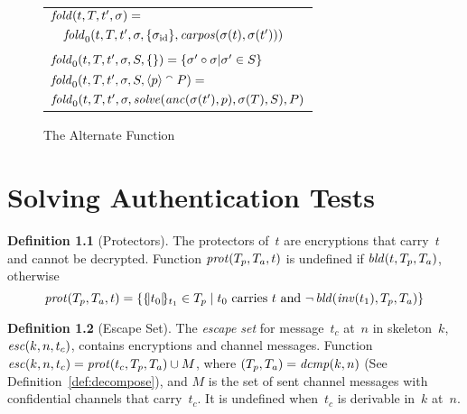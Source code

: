 \documentclass[12pt]{report}
\theoremstyle{definition}
\newtheorem{defn}{Definition}[chapter]
\begin{document}
\begin{figure}
\begin{center}
\begin{tabular}{l}
$\operatorname{\mathit{fold}}(t,T,t',\sigma)={}$\\
$\quad\operatorname{\mathit{fold}}_0(t,T,t',\sigma,\{\sigma_{\mathrm{id}}\},\operatorname{\mathit{carpos}}(\sigma(t), \sigma(t')))$\\
\\
$\operatorname{\mathit{fold}}_0(t,T,t',\sigma,S,\{\})=\{\sigma' \circ \sigma | \sigma' \in S\}$\\
$\operatorname{\mathit{fold}}_0(t,T,t',\sigma,S,\langle p\rangle \mathbin{{}^\smallfrown} P)={}$\\
\quad
$\operatorname{\mathit{fold}}_0(t,T,t',\sigma,\operatorname{\mathit{solve}}(\operatorname{\mathit{anc}}(\sigma(t'),p),\sigma(T),S),P)$\\
\end{tabular}
\end{center}
\caption{The Alternate  Function}\label{fig:fold}
\end{figure}

\chapter{Solving Authentication Tests}\label{chp:auth tests}

\begin{defn}[Protectors]
The protectors of~$t$ are encryptions that carry~$t$
and cannot be decrypted.  Function $\operatorname{\mathit{prot}}(T_p,T_a,t)$ is undefined
if $\operatorname{\mathit{bld}}(t,T_p,T_a)$, otherwise
\[\operatorname{\mathit{prot}}(T_p,T_a,t)=\{\{\!|t_0|\!\}_{t_1}\in T_p\mid
\mbox{$t_0$ carries $t$ and }\lnot\operatorname{\mathit{bld}}(\operatorname{\mathit{inv}}(t_1),T_p,T_a)\}\]
\end{defn}

\begin{defn}[Escape Set]
The \emph{escape set} for message~$t_c$ at~$n$ in
skeleton~$k$, $\operatorname{\mathit{esc}}(k,n,t_c)$, contains encryptions and channel
messages.  Function $\operatorname{\mathit{esc}}(k,n,t_c)=\operatorname{\mathit{prot}}(t_c,T_p,T_a)\cup M$,
where $(T_p,T_a)=\operatorname{\mathit{dcmp}}(k,n)$ (See Definition~\ref{def:decompose}),
and $M$ is the set of sent channel messages with confidential channels
that carry~$t_c$.  It is undefined when~$t_c$ is derivable in~$k$
at~$n$.
\end{defn}
\end{document}
